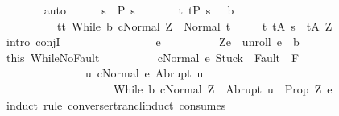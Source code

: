 \begin{isabellebody}
\ \ \ \ \ \ \isamarkupfalse%
\ auto\isanewline
\ \ \ \ \isamarkupfalse%
\ {\isachardoublequoteopen}s\ {\isasymin}\ {\isacharquery}P{\isacharprime}\ s\ {\isasymand}\ \isanewline
\ \ \ \ \ {\isacharparenleft}{\isasymforall}t{\isachardot}\ t{\isasymin}{\isacharparenleft}{\isacharquery}P{\isacharprime}\ s\ {\isasyminter}\ {\isacharminus}\ b{\isacharparenright}{\isasymlongrightarrow}\isanewline
\ \ \ \ \ \ \ \ \ \ t{\isasymin}{\isacharbraceleft}t{\isachardot}\ {\isasymGamma}{\isasymturnstile}{\isasymlangle}While\ b\ c{\isacharcomma}Normal\ Z{\isasymrangle}\ {\isasymRightarrow}\ Normal\ t{\isacharbraceright}{\isacharparenright}{\isasymand}\isanewline
\ \ \ \ \ {\isacharparenleft}{\isasymforall}t{\isachardot}\ t{\isasymin}{\isacharquery}A\ s\ {\isasymlongrightarrow}\ t{\isasymin}{\isacharquery}A\ Z{\isacharparenright}{\isachardoublequoteclose}\isanewline
\ \ \ \ \isamarkupfalse%
\ {\isacharparenleft}intro\ conjI{\isacharparenright}\isanewline
\ \ \ \ \ \ \isacommand{{\isacharbraceleft}}\isamarkupfalse%
\isanewline
\ \ \ \ \ \ \ \ \isamarkupfalse%
\ e\isanewline
\ \ \ \ \ \ \ \ \isamarkupfalse%
\ {\isachardoublequoteopen}{\isacharparenleft}Z{\isacharcomma}e{\isacharparenright}\ {\isasymin}\ {\isacharquery}unroll{\isachardoublequoteclose}\ {\isachardoublequoteopen}e\ {\isasymin}\ b{\isachardoublequoteclose}\isanewline
\ \ \ \ \ \ \ \ \isamarkupfalse%
\ this\ WhileNoFault\isanewline
\ \ \ \ \ \ \ \ \isamarkupfalse%
\ {\isachardoublequoteopen}{\isasymGamma}{\isasymturnstile}{\isasymlangle}c{\isacharcomma}Normal\ e{\isasymrangle}\ {\isasymRightarrow}{\isasymnotin}{\isacharparenleft}{\isacharbraceleft}Stuck{\isacharbraceright}\ {\isasymunion}\ Fault\ {\isacharbackquote}\ {\isacharparenleft}{\isacharminus}F{\isacharparenright}{\isacharparenright}\ {\isasymand}\ \isanewline
\ \ \ \ \ \ \ \ \ \ \ \ \ \ \ {\isacharparenleft}{\isasymforall}u{\isachardot}\ {\isasymGamma}{\isasymturnstile}{\isasymlangle}c{\isacharcomma}Normal\ e{\isasymrangle}\ {\isasymRightarrow}Abrupt\ u\ {\isasymlongrightarrow}\ \isanewline
\ \ \ \ \ \ \ \ \ \ \ \ \ \ \ \ \ \ \ \ {\isasymGamma}{\isasymturnstile}{\isasymlangle}While\ b\ c{\isacharcomma}Normal\ Z{\isasymrangle}\ {\isasymRightarrow}\ Abrupt\ u{\isacharparenright}{\isachardoublequoteclose}\ {\isacharparenleft}\ {\isachardoublequoteopen}{\isacharquery}Prop\ Z\ e{\isachardoublequoteclose}{\isacharparenright}\isanewline
\ \ \ \ \ \ \ \ \isamarkupfalse%
\ {\isacharparenleft}induct\ rule{\isacharcolon}\ converse{\isacharunderscore}rtrancl{\isacharunderscore}induct\ {\isacharbrackleft}consumes\ {}{\isacharbrackright}{\isacharparenright}\isanewline

\end{isabellebody}
